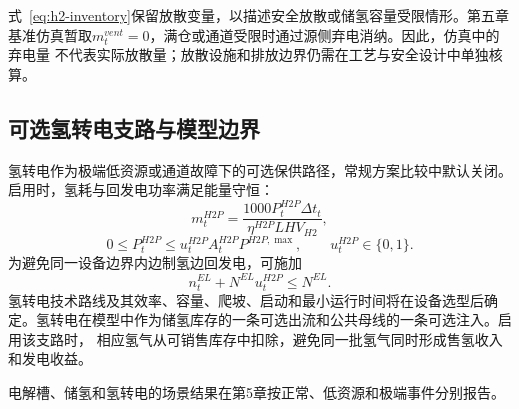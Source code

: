 式~\eqref{eq:h2-inventory}保留放散变量，以描述安全放散或储氢容量受限情形。第五章
基准仿真暂取$m_t^{vent}=0$，满仓或通道受限时通过源侧弃电消纳。因此，仿真中的弃电量
不代表实际放散量；放散设施和排放边界仍需在工艺与安全设计中单独核算。

\subsection{可选氢转电支路与模型边界}

氢转电作为极端低资源或通道故障下的可选保供路径，常规方案比较中默认关闭。
启用时，氢耗与回发电功率满足能量守恒：
\begin{equation}
m_t^{H2P}=
\frac{1000P_t^{H2P}\Delta t_t}
{\eta^{H2P}LHV_{H2}},
\label{eq:h2-to-power}
\end{equation}
\begin{equation}
0\le P_t^{H2P}\le u_t^{H2P}A_t^{H2P}P^{H2P,\max},
\qquad u_t^{H2P}\in\{0,1\}.
\label{eq:h2-to-power-cap}
\end{equation}
为避免同一设备边界内边制氢边回发电，可施加
\begin{equation}
n_t^{EL}+N^{EL}u_t^{H2P}\le N^{EL}.
\label{eq:ely-h2p-exclusive}
\end{equation}
氢转电技术路线及其效率、容量、爬坡、启动和最小运行时间将在设备选型后确定。氢转电在模型中作为储氢库存的一条可选出流和公共母线的一条可选注入。启用该支路时，
相应氢气从可销售库存中扣除，避免同一批氢气同时形成售氢收入和发电收益。

电解槽、储氢和氢转电的场景结果在第5章按正常、低资源和极端事件分别报告。
